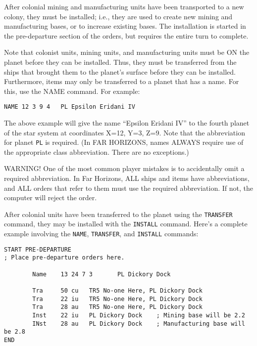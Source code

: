 \documentclass[10pt,titlepage]{article}
\begin{document}
After colonial mining and manufacturing units have been transported to a new
colony, they must be installed; i.e., they are used to create new mining and
manufacturing bases, or to increase existing bases.  The installation is
started in the pre-departure section of the orders, but requires the entire
turn to complete.

Note that colonist units, mining units, and manufacturing units must be ON the
planet before they can be installed.  Thus, they must be transferred from the
ships that brought them to the planet's surface before they can be installed.
Furthermore, items may only be transferred to a planet that has a name.  For
this, use the NAME command.  For example:

	\begin{verbatim}
NAME 12 3 9 4	PL Epsilon Eridani IV	\end{verbatim} 

The above example will give the name ``Epsilon Eridani IV'' to the fourth planet
of the star system at coordinates X=12, Y=3, Z=9.  Note that the abbreviation
for planet \texttt{PL} is required.  (In FAR HORIZONS, names ALWAYS require use of
the appropriate class abbreviation.  There are no exceptions.)

\begin{warningnote}
	WARNING! One of the most common player mistakes is to accidentally
	omit a required abbreviation.  In Far Horizons, ALL ships and items
	have abbreviations, and ALL orders that refer to them must use the
	required abbreviation.  If not, the computer will reject the order.
\end{warningnote}

\noindent After colonial units have been transferred to the planet using the \texttt{TRANSFER}
command, they may be installed with the \texttt{INSTALL} command.  Here's a complete
example involving the \texttt{NAME}, \texttt{TRANSFER}, and \texttt{INSTALL} commands:

\begin{verbatim}
START PRE-DEPARTURE
; Place pre-departure orders here.

        Name    13 24 7 3       PL Dickory Dock

        Tra     50 cu   TR5 No-one Here, PL Dickory Dock
        Tra     22 iu   TR5 No-one Here, PL Dickory Dock
        Tra     28 au   TR5 No-one Here, PL Dickory Dock
        Inst    22 iu   PL Dickory Dock    ; Mining base will be 2.2
        INst    28 au   PL Dickory Dock    ; Manufacturing base will be 2.8
END\end{verbatim} 
\end{document}
